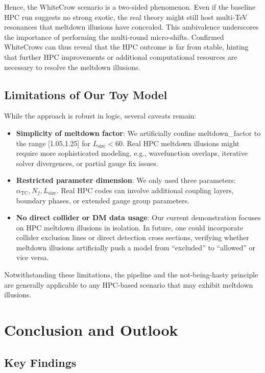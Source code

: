 \documentclass[11pt]{article}
\begin{document}
Hence, the WhiteCrow scenario is a two-sided phenomenon.
Even if the baseline HPC run suggests no strong exotic,
the real theory might still host multi-TeV resonances
that meltdown illusions have concealed.
This ambivalence underscores the importance of performing
the multi-round micro-shifts. Confirmed WhiteCrows
can thus reveal that the HPC outcome is far from stable,
hinting that further HPC improvements or additional
computational resources are necessary to resolve the meltdown illusions.

\subsection{Limitations of Our Toy Model}

While the approach is robust in logic, several caveats remain:

\begin{itemize}
\item \textbf{Simplicity of meltdown factor}:
      We artificially confine meltdown\_factor to the range [1.05,1.25]
      for $L_{\mathrm{size}} < 60$. Real HPC meltdown illusions
      might require more sophisticated modeling, e.g., wavefunction overlaps,
      iterative solver divergences, or partial gauge fix issues.
\item \textbf{Restricted parameter dimension}:
      We only used three parameters: $\alpha_{\mathrm{TC}}, N_f, L_{\mathrm{size}}$.
      Real HPC codes can involve additional coupling layers, boundary phases,
      or extended gauge group parameters.
\item \textbf{No direct collider or DM data usage}:
      Our current demonstration focuses on HPC meltdown illusions in isolation.
      In future, one could incorporate collider exclusion lines
      or direct detection cross sections, verifying whether meltdown illusions
      artificially push a model from ``excluded'' to ``allowed'' or vice versa.
\end{itemize}

Notwithstanding these limitations, the pipeline
and the not-being-hasty principle are generally applicable
to any HPC-based scenario that may exhibit meltdown illusions.

\section{Conclusion and Outlook}
\label{sec:conclusion}

\subsection{Key Findings}
\end{document}
